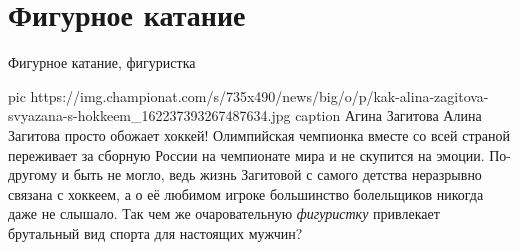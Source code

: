  
 
 
 
 
\chapter{Фигурное катание}

Фигурное катание, фигуристка

\ifcmt
  pic https://img.championat.com/s/735x490/news/big/o/p/kak-alina-zagitova-svyazana-s-hokkeem_162237393267487634.jpg
	caption Агина Загитова
\fi
Алина Загитова просто обожает хоккей! Олимпийская чемпионка вместе со всей
страной переживает за сборную России на чемпионате мира и не скупится на
эмоции. По-другому и быть не могло, ведь жизнь Загитовой с самого детства
неразрывно связана с хоккеем, а о её любимом игроке большинство болельщиков
никогда даже не слышало. Так чем же очаровательную \emph{фигуристку} привлекает
брутальный вид спорта для настоящих мужчин?
 

